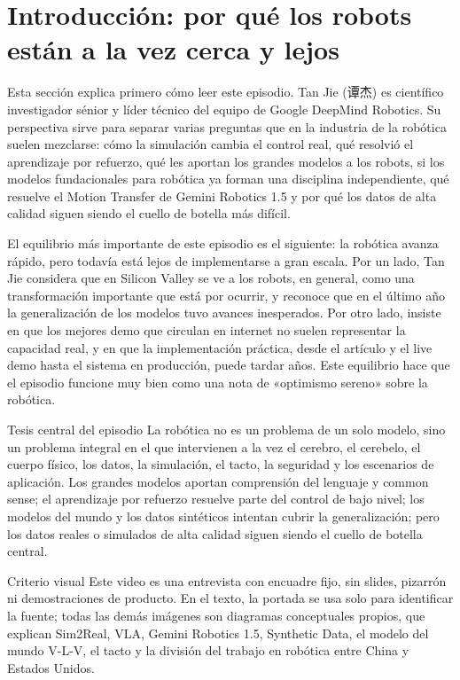\section{Introducción: por qué los robots están a la vez cerca y lejos}

Esta sección explica primero cómo leer este episodio. Tan Jie (谭杰) es científico investigador sénior y líder técnico del equipo de Google DeepMind Robotics. Su perspectiva sirve para separar varias preguntas que en la industria de la robótica suelen mezclarse: cómo la simulación cambia el control real, qué resolvió el aprendizaje por refuerzo, qué les aportan los grandes modelos a los robots, si los modelos fundacionales para robótica ya forman una disciplina independiente, qué resuelve el Motion Transfer de Gemini Robotics 1.5 y por qué los datos de alta calidad siguen siendo el cuello de botella más difícil.

El equilibrio más importante de este episodio es el siguiente: la robótica avanza rápido, pero todavía está lejos de implementarse a gran escala. Por un lado, Tan Jie considera que en Silicon Valley se ve a los robots, en general, como una transformación importante que está por ocurrir, y reconoce que en el último año la generalización de los modelos tuvo avances inesperados. Por otro lado, insiste en que los mejores demo que circulan en internet no suelen representar la capacidad real, y en que la implementación práctica, desde el artículo y el live demo hasta el sistema en producción, puede tardar años. Este equilibrio hace que el episodio funcione muy bien como una nota de «optimismo sereno» sobre la robótica.

\begin{importantbox}{Tesis central del episodio}
La robótica no es un problema de un solo modelo, sino un problema integral en el que intervienen a la vez el cerebro, el cerebelo, el cuerpo físico, los datos, la simulación, el tacto, la seguridad y los escenarios de aplicación. Los grandes modelos aportan comprensión del lenguaje y common sense; el aprendizaje por refuerzo resuelve parte del control de bajo nivel; los modelos del mundo y los datos sintéticos intentan cubrir la generalización; pero los datos reales o simulados de alta calidad siguen siendo el cuello de botella central.
\end{importantbox}

\begin{knowledgebox}{Criterio visual}
Este video es una entrevista con encuadre fijo, sin slides, pizarrón ni demostraciones de producto. En el texto, la portada se usa solo para identificar la fuente; todas las demás imágenes son diagramas conceptuales propios, que explican Sim2Real, VLA, Gemini Robotics 1.5, Synthetic Data, el modelo del mundo V-L-V, el tacto y la división del trabajo en robótica entre China y Estados Unidos.
\end{knowledgebox}

